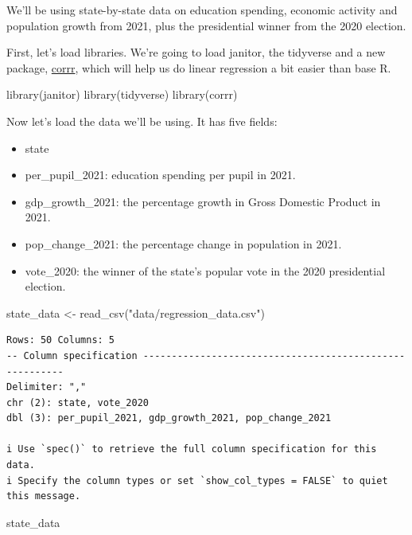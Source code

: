 \documentclass[
  letterpaper,
  DIV=11,
  numbers=noendperiod]{scrreprt}
\newenvironment{Shaded}{\begin{snugshade}}{\end{snugshade}}
\newcommand{\FunctionTok}[1]{\textcolor[rgb]{0.28,0.35,0.67}{#1}}
\newcommand{\NormalTok}[1]{\textcolor[rgb]{0.00,0.23,0.31}{#1}}
\newcommand{\OtherTok}[1]{\textcolor[rgb]{0.00,0.23,0.31}{#1}}
\newcommand{\StringTok}[1]{\textcolor[rgb]{0.13,0.47,0.30}{#1}}
\providecommand{\tightlist}{%
  \setlength{\itemsep}{0pt}\setlength{\parskip}{0pt}}\usepackage{longtable,booktabs,array}
\begin{document}
We'll be using state-by-state data on education spending, economic
activity and population growth from 2021, plus the presidential winner
from the 2020 election.

First, let's load libraries. We're going to load janitor, the tidyverse
and a new package, \href{https://corrr.tidymodels.org/}{corrr}, which
will help us do linear regression a bit easier than base R.

\begin{Shaded}
\begin{Highlighting}[]
\FunctionTok{library}\NormalTok{(janitor)}
\FunctionTok{library}\NormalTok{(tidyverse)}
\FunctionTok{library}\NormalTok{(corrr)}
\end{Highlighting}
\end{Shaded}

Now let's load the data we'll be using. It has five fields:

\begin{itemize}
\tightlist
\item
  state
\item
  per\_pupil\_2021: education spending per pupil in 2021.
\item
  gdp\_growth\_2021: the percentage growth in Gross Domestic Product in
  2021.
\item
  pop\_change\_2021: the percentage change in population in 2021.
\item
  vote\_2020: the winner of the state's popular vote in the 2020
  presidential election.
\end{itemize}

\begin{Shaded}
\begin{Highlighting}[]
\NormalTok{state\_data }\OtherTok{\textless{}{-}} \FunctionTok{read\_csv}\NormalTok{(}\StringTok{"data/regression\_data.csv"}\NormalTok{)}
\end{Highlighting}
\end{Shaded}

\begin{verbatim}
Rows: 50 Columns: 5
-- Column specification --------------------------------------------------------
Delimiter: ","
chr (2): state, vote_2020
dbl (3): per_pupil_2021, gdp_growth_2021, pop_change_2021

i Use `spec()` to retrieve the full column specification for this data.
i Specify the column types or set `show_col_types = FALSE` to quiet this message.
\end{verbatim}

\begin{Shaded}
\begin{Highlighting}[]
\NormalTok{state\_data}
\end{Highlighting}
\end{Shaded}
\end{document}
